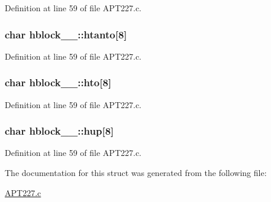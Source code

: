 Definition at line 59 of file A\+P\+T227.\+c.

\subsubsection[{\texorpdfstring{htanto}{htanto}}]{\setlength{\rightskip}{0pt plus 5cm}char hblock\+\_\+\_\+\+::htanto\mbox{[}8\mbox{]}}\hypertarget{structhblock__1___a19d01900d5c46cce77c178727367e910}{}\label{structhblock__1___a19d01900d5c46cce77c178727367e910}


Definition at line 59 of file A\+P\+T227.\+c.

\subsubsection[{\texorpdfstring{hto}{hto}}]{\setlength{\rightskip}{0pt plus 5cm}char hblock\+\_\+\_\+\+::hto\mbox{[}8\mbox{]}}\hypertarget{structhblock__1___a762da4c87f0fc9b43541f727d33abc48}{}\label{structhblock__1___a762da4c87f0fc9b43541f727d33abc48}


Definition at line 59 of file A\+P\+T227.\+c.

\subsubsection[{\texorpdfstring{hup}{hup}}]{\setlength{\rightskip}{0pt plus 5cm}char hblock\+\_\+\_\+\+::hup\mbox{[}8\mbox{]}}\hypertarget{structhblock__1___aefd21ab91218c2fa1a2b9da0121fe9dc}{}\label{structhblock__1___aefd21ab91218c2fa1a2b9da0121fe9dc}


Definition at line 59 of file A\+P\+T227.\+c.



The documentation for this struct was generated from the following file\+:\begin{DoxyCompactItemize}
\item 
\hyperlink{APT227_8c}{A\+P\+T227.\+c}\end{DoxyCompactItemize}

